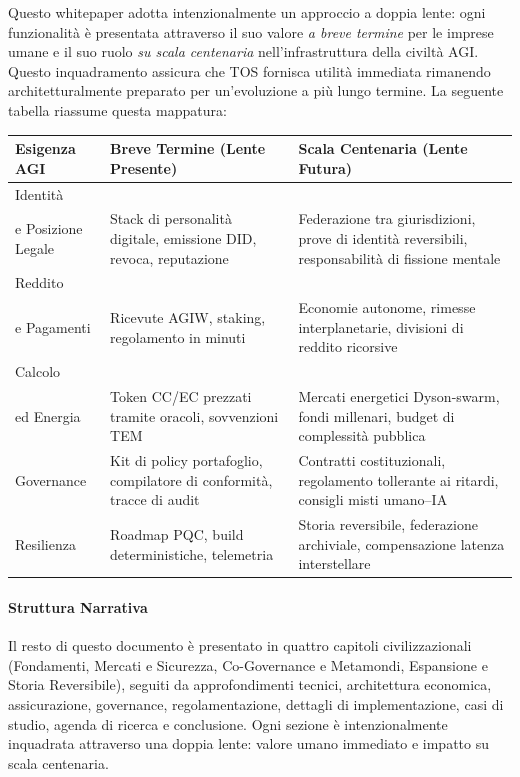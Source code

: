 \documentclass[11pt]{article}
\begin{document}
Questo whitepaper adotta intenzionalmente un approccio a doppia lente: ogni funzionalità è presentata attraverso il suo valore \emph{a breve termine} per le imprese umane e il suo ruolo \emph{su scala centenaria} nell'infrastruttura della civiltà AGI. Questo inquadramento assicura che TOS fornisca utilità immediata rimanendo architetturalmente preparato per un'evoluzione a più lungo termine. La seguente tabella riassume questa mappatura:

\begin{longtable}{@{}p{}p{}p{}@{}}
\toprule
\textbf{Esigenza AGI} & \textbf{Breve Termine (Lente Presente)} & \textbf{Scala Centenaria (Lente Futura)} \\\midrule
Identità \\ e Posizione Legale & Stack di personalità digitale, emissione DID, revoca, reputazione & Federazione tra giurisdizioni, prove di identità reversibili, responsabilità di fissione mentale \\
Reddito \\ e Pagamenti & Ricevute AGIW, staking, regolamento in minuti & Economie autonome, rimesse interplanetarie, divisioni di reddito ricorsive \\
Calcolo \\ ed Energia & Token CC/EC prezzati tramite oracoli, sovvenzioni TEM & Mercati energetici Dyson-swarm, fondi millenari, budget di complessità pubblica \\
Governance & Kit di policy portafoglio, compilatore di conformità, tracce di audit & Contratti costituzionali, regolamento tollerante ai ritardi, consigli misti umano--IA \\
Resilienza & Roadmap PQC, build deterministiche, telemetria & Storia reversibile, federazione archiviale, compensazione latenza interstellare \\\bottomrule
\end{longtable}

\paragraph{Struttura Narrativa} Il resto di questo documento è presentato in quattro capitoli civilizzazionali (Fondamenti, Mercati e Sicurezza, Co-Governance e Metamondi, Espansione e Storia Reversibile), seguiti da approfondimenti tecnici, architettura economica, assicurazione, governance, regolamentazione, dettagli di implementazione, casi di studio, agenda di ricerca e conclusione. Ogni sezione è intenzionalmente inquadrata attraverso una doppia lente: valore umano immediato e impatto su scala centenaria.
\end{document}
